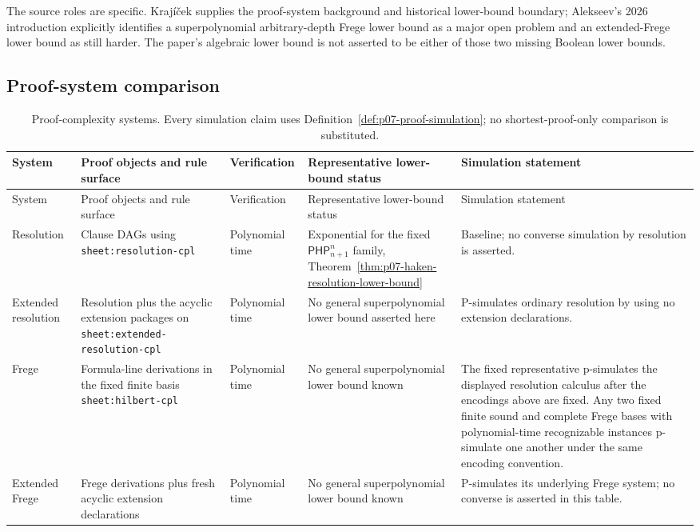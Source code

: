 The source roles are specific.  Kraj\'i\v{c}ek supplies the proof-system
background and historical lower-bound boundary; Alekseev's 2026 introduction
explicitly identifies a superpolynomial arbitrary-depth Frege lower bound as a
major open problem and an extended-Frege lower bound as still harder.  The
paper's algebraic lower bound is not asserted to be either of those two
missing Boolean lower bounds.

\begin{landscape}
\thispagestyle{plain}
\section{Proof-system comparison}
\label{sec:p07-proof-system-comparison}
\begingroup\scriptsize
\setlength{\tabcolsep}{3pt}
\begin{longtable}{@{}p{.70in}p{1.70in}p{.80in}p{1.65in}p{1.80in}@{}}
\caption{Proof-complexity systems.  Every simulation claim
  uses Definition~\ref{def:p07-proof-simulation}; no shortest-proof-only
  comparison is substituted.}
\label{tab:p07-proof-complexity-systems}\\
\toprule
System & Proof objects and rule surface & Verification & Representative lower-bound status & Simulation statement \\
\midrule
\endfirsthead
\toprule
System & Proof objects and rule surface & Verification & Representative lower-bound status & Simulation statement \\
\midrule
\endhead
Resolution & Clause DAGs using \texttt{sheet:resolution-cpl} & Polynomial time & Exponential for the fixed \(\mathsf{PHP}^{n}_{n+1}\) family, Theorem~\ref{thm:p07-haken-resolution-lower-bound} & Baseline; no converse simulation by resolution is asserted. \\
\addlinespace
Extended resolution & Resolution plus the acyclic extension packages on \texttt{sheet:extended-resolution-cpl} & Polynomial time & No general superpolynomial lower bound asserted here & P-simulates ordinary resolution by using no extension declarations. \\
\addlinespace
Frege & Formula-line derivations in the fixed finite basis \texttt{sheet:hilbert-cpl} & Polynomial time & No general superpolynomial lower bound known & The fixed representative p-simulates the displayed resolution calculus after the encodings above are fixed.  Any two fixed finite sound and complete Frege bases with polynomial-time recognizable instances p-simulate one another under the same encoding convention. \\
\addlinespace
Extended Frege & Frege derivations plus fresh acyclic extension declarations & Polynomial time & No general superpolynomial lower bound known & P-simulates its underlying Frege system; no converse is asserted in this table. \\
\bottomrule
\end{longtable}
\endgroup
\end{landscape}

